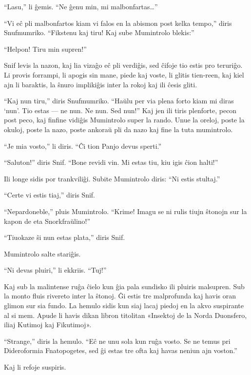 ``Lasu,'' li ĝemis. ``Ne ĝenu min, mi malbonfartas{\ldots}''

``Vi eĉ pli malbonfartos kiam vi falos en la abismon post kelka tempo,'' diris Snufmumriko. ``Fikstenu kaj tiru! Kaj sube Mumintrolo blekis:''

``Helpon! Tiru min supren!''

Snif levis la nazon, kaj lia vizaĝo eĉ pli verdiĝis, sed ĉifoje tio estis pro teruriĝo. Li provis forrampi, li apogis sin mane, piede kaj voste, li glitis tien-reen, kaj kiel ajn li baraktis, la ŝnuro implikiĝis inter la rokoj kaj ili ĉesis gliti.

``Kaj nun tiru,'' diris Snufmumriko. ``Haŭlu per via plena forto kiam mi diras `nun'. Tio estas --- ne nun. Ne nun. Sed nun!'' Kaj jen ili tiris plenforte, pecon post peco, kaj finfine vidiĝis Mumintrolo super la rando. Unue la oreloj, poste la okuloj, poste la nazo, poste ankoraŭ pli da nazo kaj fine la tuta mumintrolo.

``Je mia vosto,'' li diris. ``Ĉi tion Panjo devus sperti.''

``Saluton!'' diris Snif. ``Bone revidi vin. Mi estas tiu, kiu igis ĉion halti!''

Ili longe sidis por trankviliĝi. Subite Mumintrolo diris: ``Ni estis stultaj.''

``Certe vi estis tiaj,'' diris Snif.

``Nepardoneble,'' pluis Mumintrolo. ``Krime! Imagu se ni rulis tiujn ŝtonojn sur la kapon de eta Snorkfraŭlino!''

``Tiuokaze ŝi nun estas plata,'' diris Snif.

Mumintrolo salte stariĝis.

``Ni devas pluiri,'' li ekkriis. ``Tuj!''

Kaj sub la malintense ruĝa ĉielo kun ĝia pala sundisko ili pluiris malsupren.
\sectionbreak
Sub la monto fluis rivereto inter la ŝtonoj. Ĝi estis tre malprofunda kaj havis oran glimon sur sia fundo. La hemulo sidis kun siaj lacaj piedoj en la akvo suspirante al si mem. Apude li havis dikan libron titolitan «Insektoj de la Norda Duonsfero, iliaj Kutimoj kaj Fikutimoj».

``Strange,'' diris la hemulo. ``Eĉ ne unu sola kun ruĝa vosto. Se ne temus pri Dideroformia Fnatopogetes, sed ĝi estas tre ofta kaj havas neniun ajn voston.''

Kaj li refoje suspiris.

